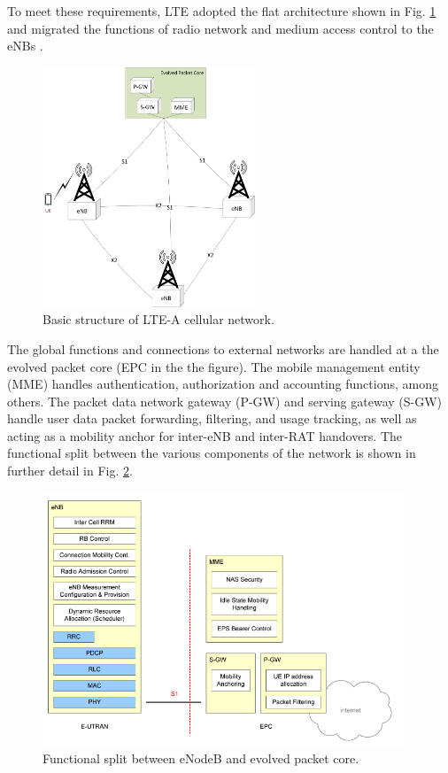 To meet these requirements, LTE adopted the flat architecture shown in Fig. \ref{figs:LTE-A-Network} and migrated the functions of radio network and medium access control to the eNBs \cite{tr36300}. 
\begin{figure}[!ht]
	\centering
	\includegraphics[width=2.5in]{figures3/lteAnet}
	\caption{Basic structure of LTE-A cellular network.}
	\label{figs:LTE-A-Network}
\end{figure}
The global functions and connections to external networks are handled at a the evolved packet core (EPC in the the figure). The mobile management entity (MME) handles authentication, authorization and accounting functions, among others.  The packet data network gateway (P-GW) and serving gateway (S-GW) handle user data packet forwarding, filtering, and usage tracking, as well as acting as a mobility anchor for inter-eNB and inter-RAT handovers.  The functional split between the various components of the network is shown in further detail in Fig. \ref{figs:funcSplit}.

\begin{figure}[!ht]
	\centering
	\includegraphics[width=4.25in]{figures3/functionalsplit}
	\caption{Functional split between eNodeB and evolved packet core.}
	\label{figs:funcSplit}
\end{figure}

